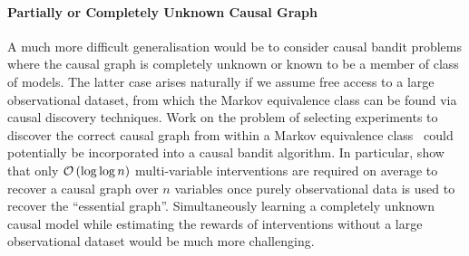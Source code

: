 \paragraph{Partially or Completely Unknown Causal Graph}
A much more difficult generalisation would be to consider causal bandit problems where the causal graph is completely unknown or known to be a member of class of models.
The latter case arises naturally if we assume free access to a large observational dataset, from which the Markov equivalence class can be found via causal discovery techniques. 
Work on the problem of selecting experiments to discover the correct causal graph from within a Markov equivalence class~\cite{Eberhardt2005,eberhardt2010causal,hauser2014two,Hu2014b} could potentially be incorporated into a causal bandit algorithm.
In particular, \citet{Hu2014b} show that only $\mathcal{O}\left( \log \log n \right)$ multi-variable interventions are required on average to recover a causal graph over $n$ variables once purely observational data is used to recover the ``essential graph''.
Simultaneously learning a completely unknown causal model while estimating the rewards of interventions without a large observational dataset would be much more challenging.





